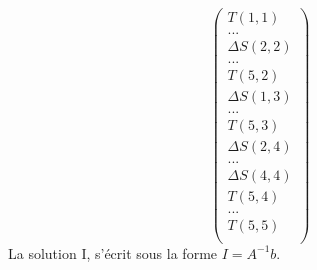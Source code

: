 \begin{equation}
\begin{pmatrix}
T(1,1)\\
...\\
\Delta S(2,2)\\
...\\
T(5,2)\\
\Delta S(1,3)\\
...\\
T(5,3)\\
\Delta S(2,4)\\
...\\
\Delta S(4,4)\\
T(5,4)\\
...\\
T(5,5)\\
\end{pmatrix}
\end{equation}
La solution I, s'écrit sous la forme $I = A^{-1}b$.

